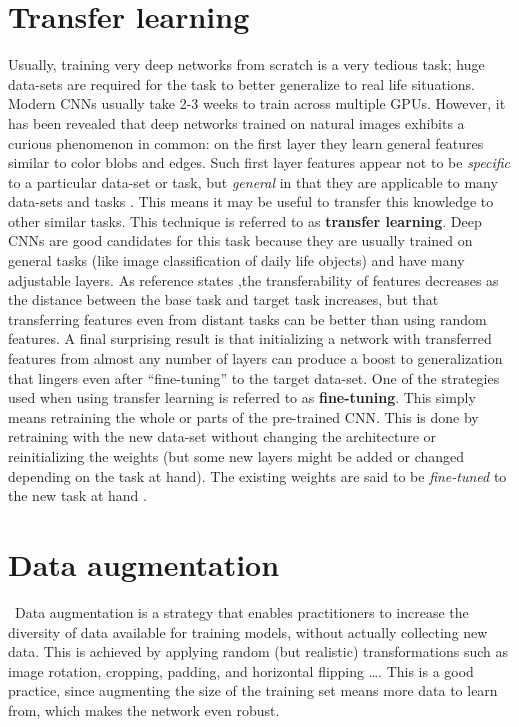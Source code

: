 \section{Transfer learning}\label{tl}
Usually, training very deep networks from scratch is a very tedious task; huge data-sets are required for the task to better generalize to real life situations. Modern CNNs usually take 2-3 weeks to train across multiple GPUs. However, it has been revealed that deep networks trained on natural images exhibits a curious phenomenon in common: on the first layer they learn general features similar to color blobs and edges. Such first layer features appear not to be \emph{specific} to a particular data-set or task, but \emph{general} in that they are applicable to many data-sets and tasks \cite{Transfer}. This means it may be useful to transfer this knowledge to other similar tasks. This technique is referred to as \textbf{transfer learning}. Deep CNNs are good candidates for this task because they are usually trained on general tasks (like image classification of daily life objects) and have many adjustable layers. As reference \cite{Transfer} states ,the transferability of features decreases as the distance between the base task and target task increases, but that transferring features even from distant tasks can be better than using random features. A final surprising result is that initializing a network with transferred features from almost any number of layers can produce a boost to generalization that lingers even after ``fine-tuning'' to the target data-set. One of the strategies used when using transfer learning is referred to as \textbf{fine-tuning}.
This simply means retraining the whole or parts of the pre-trained CNN. This is done by retraining with the new data-set without changing the architecture or reinitializing the weights (but some new layers might be added or changed depending on the task at hand). The existing weights are said to be \emph{fine-tuned} to the new task at hand \cite{ntnu}.

\section{Data augmentation} \label{data_aug}
\
Data augmentation is a strategy that enables practitioners to increase the diversity of data available for training models, without actually collecting new data. This is achieved by applying random (but realistic) transformations such as image rotation, cropping, padding, and horizontal flipping \ldots. This is a good practice, since augmenting the size of the training set means more data to learn from, which makes the network even robust.
